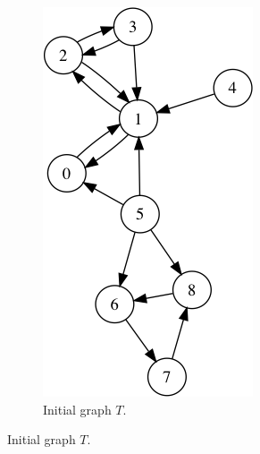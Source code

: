 \begin{figure}
\centering

\begin{subfigure}{0.25\textwidth}
\includegraphics[width=\linewidth]{images/mani/0-trust.png}
\caption{Initial graph $T$.} \label{fig:mani0}
\end{subfigure}
\hspace*{2cm} %

\end{figure}
